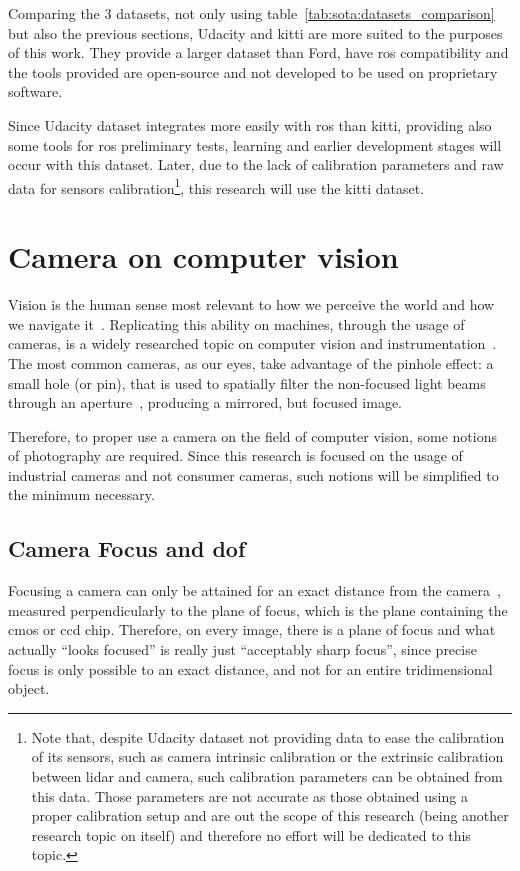 Comparing the 3 datasets, not only using table~\ref{tab:sota:datasets_comparison} but also the previous sections, Udacity and \ac{kitti} are more suited to the purposes of this work. They provide a larger dataset than Ford, have \ac{ros} compatibility and the tools provided are open-source and not developed to be used on proprietary software.

Since Udacity dataset integrates more easily with \ac{ros} than \ac{kitti}, providing also some tools for \ac{ros} preliminary tests, learning and earlier development stages will occur with this dataset. Later, due to the lack of calibration parameters and raw data for sensors calibration\footnote{Note that, despite Udacity dataset not providing data to ease the calibration of its sensors, such as camera intrinsic calibration or the extrinsic calibration between \ac{lidar} and camera, such calibration parameters can be obtained from this data. Those parameters are not accurate as those obtained using a proper calibration setup and are out the scope of this research (being another research topic on itself) and therefore no effort will be dedicated to this topic.}, this research will use the \ac{kitti} dataset.

\section{Camera on computer vision}
Vision is the human sense most relevant to how we perceive the world and how we navigate it~\cite{Ekstrom2015}. Replicating this ability on machines, through the usage of cameras, is a widely researched topic on computer vision and instrumentation~\citeneeded. The most common cameras, as our eyes, take advantage of the pinhole effect: a small hole (or pin), that is used to spatially filter the non-focused light beams through an aperture~\cite{camera_models, Sturm2010}, producing a mirrored, but focused image.

Therefore, to proper use a camera on the field of computer vision, some notions of photography are required. Since this research is focused on the usage of industrial cameras and not consumer cameras, such notions will be simplified to the minimum necessary. 

\subsection{Camera Focus and \acl{dof}}
Focusing a camera can only be attained for an exact distance from the camera~\cite{Merklinger1993, Photopillers}, measured perpendicularly to the plane of focus, which is the plane containing the \ac{cmos} or \ac{ccd} chip. Therefore, on every image, there is a plane of focus and what actually ``looks focused'' is really just ``acceptably sharp focus'', since precise focus is only possible to an exact distance, and not for an entire tridimensional object.

